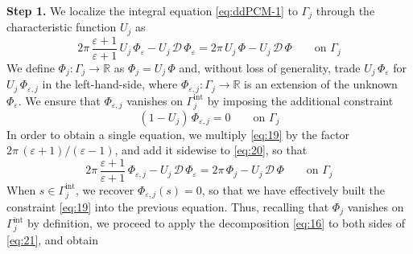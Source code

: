 {\bf Step 1.} 
We localize the integral equation \eqref{eq:ddPCM-1} to $\Gamma_j$ through the characteristic function $U_j$ as
\begin{equation}\label{eq:20}
2 \pi \, \frac{\varepsilon + 1}{\varepsilon + 1} \, U_j \, \Phi_{\varepsilon} - U_j \, {\mathcal{D} \, \Phi}_\varepsilon = 2 \pi \, U_j \, \Phi - U_j \, {\mathcal{D} \, \Phi} \qquad \text{on }\Gamma_j
\end{equation}
We define $\Phi_j : \Gamma_j \to \mathbb{R}$ as $\Phi_j = U_j\,\Phi$ and, without loss of generality, trade $U_j \, \Phi_\varepsilon$ for $U_j \, \Phi_{\varepsilon,j}$ in the left-hand-side, where $\Phi_{\varepsilon,j} : \Gamma_j \to \mathbb{R}$ is an extension of the unknown $\Phi_\varepsilon$. We ensure that $\Phi_{\varepsilon,j}$ vanishes on $\Gamma_j^\text{int}$ by imposing the additional constraint
\begin{equation}\label{eq:19}
(1 - U_j) \, \Phi_{\varepsilon,j}  = 0\qquad \text{on }\Gamma_j 
\end{equation}
In order to obtain a single equation, we multiply \eqref{eq:19} by the factor $2\pi \, (\varepsilon+1)/(\varepsilon-1)$, and add it sidewise to \eqref{eq:20}, so that 
\begin{equation}\label{eq:21}
2 \pi \, \frac{\varepsilon + 1}{\varepsilon + 1} \, \Phi_{\varepsilon,j} - U_j \, {\mathcal{D} \, \Phi}_\varepsilon = 2 \pi \, \Phi_j - U_j \, {\mathcal{D} \, \Phi} \qquad \text{on }\Gamma_j
\end{equation}
When $s \in \Gamma_j^\text{int}$, we recover $\Phi_{\varepsilon,j}(s) = 0$, so that we have effectively built the constraint \eqref{eq:19} into the previous equation. Thus, recalling that $\Phi_j$ vanishes on $\Gamma_j^\text{int}$ by definition, we proceed to apply the decomposition \eqref{eq:16} to both sides of \eqref{eq:21}, and obtain
